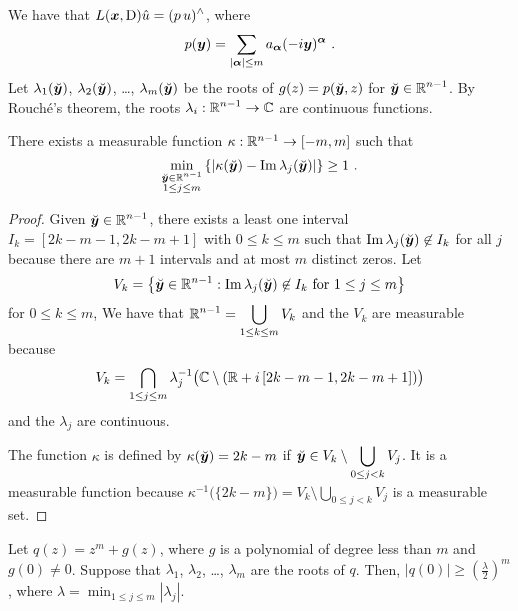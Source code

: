 We have that $\displaystyle L({\bm{x}},\operatorname{D})\hat{u} = (p\, u)^\wedge$, where
\begin{equation} \label{distr_lPDE3_ex1}
p({\bm{y}}) = \sum_{|{\bm{\alpha}}|\leq m} a_{{\bm{\alpha}}}
(-i{\bm{y}})^{{\bm{\alpha}}} \ .
\end{equation}
Let $\lambda_1(\breve{{\bm{y}}})$, $\lambda_2(\breve{{\bm{y}}})$, \ldots,
$\lambda_m(\breve{{\bm{y}}})$ be the roots of
$\displaystyle g(z) = p(\breve{{\bm{y}}}, z)$ for
$\displaystyle \breve{{\bm{y}}}\in \mathbb{R}^{n-1}$.
By Rouch\'e's theorem, the roots
$\displaystyle \lambda_i:\mathbb{R}^{n-1} \rightarrow \mathbb{C}$
are continuous functions.

\begin{lemma} \label{distr_lPDE3_ex2}
There exists a measurable function $\kappa:\mathbb{R}^{n-1}\rightarrow [-m,m]$
such that
\[
\min_{\substack{\breve{{\bm{y}}} \in \mathbb{R}^{n-1}\\ 1\leq j \leq m}}
\left\{ \left|\kappa(\breve{{\bm{y}}})
- \operatorname{Im} \lambda_j(\breve{{\bm{y}}})\right| \right\} \geq 1 \ .
\]
\end{lemma}

\begin{proof}
Given $\displaystyle \breve{{\bm{y}}} \in \mathbb{R}^{n-1}$, there exists a
least one interval
$\displaystyle I_k = [2k-m-1, 2k-m+1]$ with $0\leq k \leq m$ such that
$\operatorname{Im} \lambda_j(\breve{{\bm{y}}}) \not\in I_k$ for all $j$ because there
are $m+1$ intervals and at most $m$ distinct zeros.  Let
\[
V_k = \left\{ \breve{{\bm{y}}} \in \mathbb{R}^{n-1} :
\operatorname{Im} \lambda_j(\breve{{\bm{y}}}) \not\in I_k \ \text{for} \ 1 \leq j
\leq m \right\}
\]
for $0 \leq k \leq m$,  We have that
$\displaystyle \mathbb{R}^{n-1} = \bigcup_{1\leq k \leq m} V_k$ and
the $V_k$ are measurable because
\[
V_k = \bigcap_{1\leq j \leq m} \lambda_j^{-1}\big(\mathbb{C} \setminus
(\mathbb{R} + i\,[2k-m-1,2k-m+1])\big)
\]
and the $\lambda_j$ are continuous.

The function $\kappa$ is defined by
$\displaystyle \kappa(\breve{{\bm{y}}}) = 2k-m$ if
$\displaystyle \breve{{\bm{y}}} \in V_k \setminus \bigcup_{0\leq j<k} V_j$.
It is a measurable function because
$\displaystyle \kappa^{-1}\big(\{2k-m\}\big)
= V_k \setminus \bigcup_{0\leq j<k} V_j$
is a measurable set.
\end{proof}

\begin{lemma} \label{distr_lPDE3_ex3}
Let $\displaystyle q(z) = z^m + g(z)$, where $g$ is a polynomial of
degree less than $m$ and $g(0) \neq 0$.  Suppose that $\lambda_1$,
$\lambda_2$, \ldots, $\lambda_m$ are the roots of $q$.  Then,
$\displaystyle \left| q(0)\right| \geq \left(\frac{\lambda}{2}\right)^m$,
where $\displaystyle \lambda = \min_{1\leq j\leq m} |\lambda_j|$.
\end{lemma}

